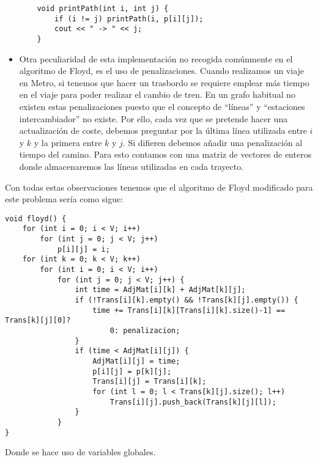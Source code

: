 \documentclass[spanish, a4paper, 12pt] {article}
\begin{document}
\begin{itemize}
{\begin{verbatim}
    void printPath(int i, int j) {
        if (i != j) printPath(i, p[i][j]);
        cout << " -> " << j;
    }
\end{verbatim}
}
\item{
Otra peculiaridad de esta implementación no recogida comúnmente en el algoritmo de Floyd, es el uso de penalizaciones. Cuando realizamos un viaje en Metro, si tenemos que hacer un trasbordo se requiere emplear más tiempo en el viaje para poder realizar el cambio de tren. En un grafo habitual no existen estas penalizaciones puesto que el concepto de ``líneas'' y ``estaciones intercambiador'' no existe. Por ello, cada vez que se pretende hacer una actualización de coste, debemos preguntar por la última línea utilizada entre $i$ y $k$ y la primera entre $k$ y $j$. Si difieren debemos añadir una penalización al tiempo del camino. Para esto contamos con una matriz de vectores de enteros donde almacenaremos las líneas utilizadas en cada trayecto.
}
\end{itemize}
Con todas estas observaciones tenemos que el algoritmo de Floyd modificado para este problema sería como sigue:
\begin{verbatim}
void floyd() {
    for (int i = 0; i < V; i++)
        for (int j = 0; j < V; j++)
            p[i][j] = i;
    for (int k = 0; k < V; k++)
        for (int i = 0; i < V; i++)
            for (int j = 0; j < V; j++) {
                int time = AdjMat[i][k] + AdjMat[k][j];
                if (!Trans[i][k].empty() && !Trans[k][j].empty()) {
                    time += Trans[i][k][Trans[i][k].size()-1] == Trans[k][j][0]?
                        0: penalizacion;
                }
                if (time < AdjMat[i][j]) {
                    AdjMat[i][j] = time;
                    p[i][j] = p[k][j];
                    Trans[i][j] = Trans[i][k];
                    for (int l = 0; l < Trans[k][j].size(); l++)
                        Trans[i][j].push_back(Trans[k][j][l]);
                }
            }
}
\end{verbatim}
Donde se hace uso de variables globales.
\end{document}
